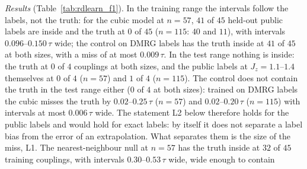\documentclass[aps,prx,onecolumn,10pt,nofootinbib,longbibliography,floatfix]{revtex4-2}
\theoremstyle{remark}
\newcommand{\Jz}{J_z}
\begin{document}
\emph{Results} (Table~\ref{tab:rdlearn_f1}). In the training range the intervals follow the labels, not the
truth: for the cubic model at $n=57$, $41$ of $45$ held-out public labels are inside and the truth at $0$ of $45$ %
($n=115$: $40$ and $11$), with intervals $0.096$--$0.150\,\tau$ wide; the control on DMRG labels has the truth %
inside at $41$ of $45$ at both sizes, with a miss of at most $0.009\,\tau$. In the test range nothing is inside: %
the truth at $0$ of $4$ couplings at both sizes, and the public labels at $\Jz=1.1$--$1.4$ themselves at $0$ of $4$ %
($n=57$) and $1$ of $4$ ($n=115$). The control does not contain the truth in the test range either ($0$ of $4$ at %
both sizes): trained on DMRG labels the cubic misses the truth by $0.02$--$0.25\,\tau$ ($n=57$) and %
$0.02$--$0.20\,\tau$ ($n=115$) with intervals at most $0.006\,\tau$ wide. The statement L2 below therefore holds %
for the public labels and would hold for exact labels: by itself it does not separate a label bias from the error
of an extrapolation. What separates them is the size of the miss, L1. The nearest-neighbour null at $n=57$ has the %
truth inside at $32$ of $45$ training couplings, with intervals $0.30$--$0.53\,\tau$ wide, wide enough to contain %
\end{document}
